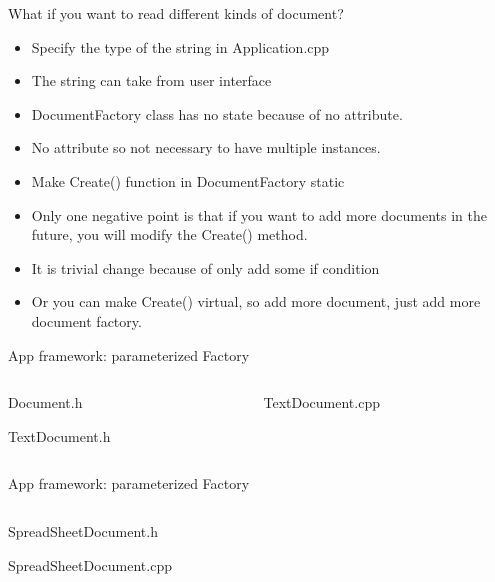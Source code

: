 \documentclass[13pt]{beamer}
\begin{document}
\begin{frame}{What if you want to read different kinds of document?}
\begin{itemize}
	\setlength\itemsep{1em}
	\item Specify the type of the string in Application.cpp
	\item The string can take from user interface
	\item DocumentFactory class has no state because of no attribute.
	\item No attribute so not necessary to have multiple instances.
	\item Make Create() function in DocumentFactory static
	\item Only one negative point is that if you want to add more documents in the future, you will modify the Create() method.
	\item It is trivial change because of only add some if condition
	\item Or you can make Create() virtual, so add more document, just add more document factory.
\end{itemize}
\end{frame}

\begin{frame}{App framework: parameterized Factory}
\begin{columns}[T]
\begin{column}{.45\textwidth}
\lstset{basicstyle=\tiny,style=myCustomCppStyle}
Document.h

TextDocument.h

\end{column}

\begin{column}{.45\textwidth}
\lstset{basicstyle=\tiny,style=myCustomCppStyle}
TextDocument.cpp

\end{column}
\end{columns}
\end{frame}

\begin{frame}{App framework: parameterized Factory}
\begin{columns}[T]
\begin{column}{.45\textwidth}
\lstset{basicstyle=\tiny,style=myCustomCppStyle}
SpreadSheetDocument.h

SpreadSheetDocument.cpp

\end{column}

\begin{column}{.45\textwidth}
\lstset{basicstyle=\tiny,style=myCustomCppStyle}
\end{column}
\end{columns}
\end{frame}
\end{document}
